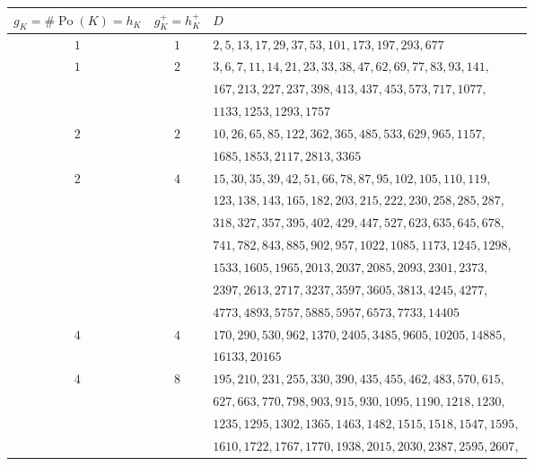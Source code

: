 \documentclass[12pt]{amsart}
\theoremstyle{definition}
\numberwithin{equation}{section}
\DeclareMathOperator{\Po}{Po}
\begin{document}
{\begin{table}[!h]
	\begin{center}
		\begin{tabular}{|c|c|p{9.2cm}|} 
			\hline
			$g_K=\#\Po(K)=h_K$ & $g_K^+=h_K^+$ & $D$   \\ [0.5ex] 
			\hline \hline
			$1$ & $1$ & $2, 5, 13, 17, 29, 37, 53, 101, 173, 197, 293, 677$ \\
			\hline
			\multirow{3}{0.6em}{$1$}  &\multirow{3}{0.6em}{$2$} & $3, 6, 7, 11, 14, 21, 23, 33, 38, 47, 62, 69, 77, 83, 93, 141,$ \\
			& & $167, 213, 227,237, 398, 413, 437, 453, 573, 717, 1077,$ \\
			& & $1133, 1253, 1293, 1757$ \\
			\hline 
			\multirow{2}{0.6em}{$2$}& 	\multirow{2}{0.6em}{$2$} & $10, 26, 65, 85, 122, 362, 365, 485, 533, 629, 965, 1157,$ \\
			& & $1685, 1853, 2117, 2813, 3365$ \\
			\hline 
			\multirow{7}{0.6em}{$2$}& 	\multirow{7}{0.6em}{$4$} &  $15, 30, 35, 39, 42, 51, 66, 78, 87, 95, 102,105, 110, 119,$ \\
			& & $ 123, 138, 143, 165, 182, 203, 215, 222, 230, 258, 285,287,$  \\
			& & $  318, 327, 357, 395, 402, 429, 447, 527, 623, 635, 645, 678, $ \\
			& & $ 741,782, 843, 885, 902, 957, 1022, 1085, 1173,1245, 1298,$ \\
			& & $  1533, 1605, 1965, 2013,2037, 2085, 2093, 2301, 2373,$ \\
			&& $ 2397,2613, 2717, 3237,3597, 3605, 3813,  4245, 4277, $ \\
			& & $4773, 4893, 5757, 5885,5957, 6573, 7733, 14405$ \\
			\hline 
			\multirow{2}{0.6em}{$4$}& 	\multirow{2}{0.6em}{$4$} & $170, 290, 530, 962, 1370, 2405, 3485, 9605,10205, 14885,$ \\
			& & $ 16133, 20165$ \\
			\hline	
			\multirow{10}{0.6em}{$4$}& 	\multirow{10}{0.6em}{$8$} & $195, 210, 231, 255, 330, 390, 435, 455, 462, 483,570, 615,$ \\ 
			& & $627, 663, 770, 798, 903, 915, 930, 1095, 1190, 1218, 1230,$ \\
			& & $1235, 1295, 1302, 1365, 1463, 1482, 1515, 1518, 1547, 1595,$ \\
			& & $1610,1722, 1767, 1770, 1938, 2015, 2030, 2387, 2595, 2607,$ \\

\end{tabular}
\end{center}
\end{table}}
\end{document}
